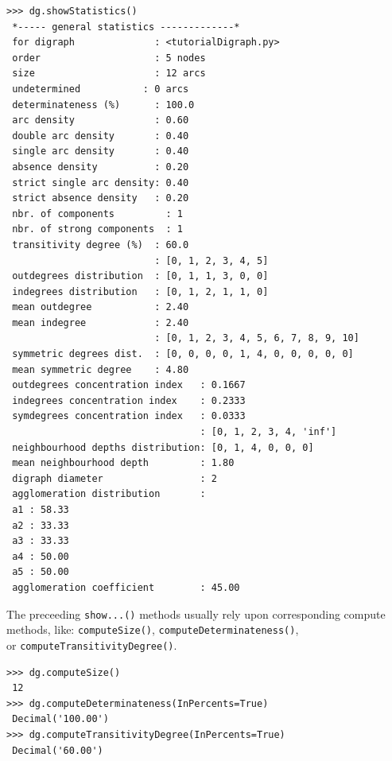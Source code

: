 \begin{lstlisting}[caption={Inspecting a \texttt{Digraph} object},label=list:1.5]
>>> dg.showStatistics()
 *----- general statistics -------------*
 for digraph              : <tutorialDigraph.py>
 order                    : 5 nodes
 size                     : 12 arcs
 undetermined           : 0 arcs
 determinateness (%)      : 100.0
 arc density              : 0.60
 double arc density       : 0.40
 single arc density       : 0.40
 absence density          : 0.20
 strict single arc density: 0.40
 strict absence density   : 0.20
 nbr. of components         : 1
 nbr. of strong components  : 1
 transitivity degree (%)  : 60.0
                          : [0, 1, 2, 3, 4, 5]
 outdegrees distribution  : [0, 1, 1, 3, 0, 0]
 indegrees distribution   : [0, 1, 2, 1, 1, 0]
 mean outdegree           : 2.40
 mean indegree            : 2.40
                          : [0, 1, 2, 3, 4, 5, 6, 7, 8, 9, 10]
 symmetric degrees dist.  : [0, 0, 0, 0, 1, 4, 0, 0, 0, 0, 0]
 mean symmetric degree    : 4.80
 outdegrees concentration index   : 0.1667
 indegrees concentration index    : 0.2333
 symdegrees concentration index   : 0.0333
                                  : [0, 1, 2, 3, 4, 'inf']
 neighbourhood depths distribution: [0, 1, 4, 0, 0, 0]
 mean neighbourhood depth         : 1.80
 digraph diameter                 : 2
 agglomeration distribution       :
 a1 : 58.33
 a2 : 33.33
 a3 : 33.33
 a4 : 50.00
 a5 : 50.00
 agglomeration coefficient        : 45.00
\end{lstlisting}

The preceeding \texttt{show...()} methods usually rely upon corresponding compute methods, like: \texttt{computeSize()}, \texttt{computeDeterminateness()},\\ or \texttt{computeTransitivityDegree()}.
\begin{lstlisting}[caption={Various \texttt{compute...()} methods.},label=list:1.6]
>>> dg.computeSize()
 12
>>> dg.computeDeterminateness(InPercents=True)
 Decimal('100.00')
>>> dg.computeTransitivityDegree(InPercents=True)
 Decimal('60.00')
\end{lstlisting}

